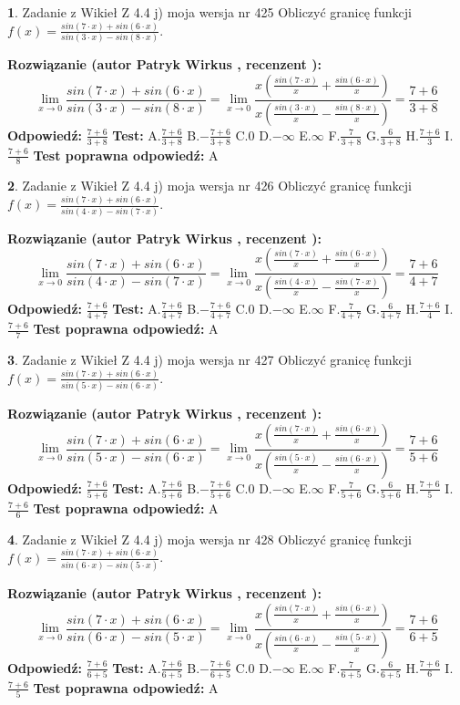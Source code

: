 \documentclass[12pt, a4paper]{article}
\theoremstyle{definition} %
\newtheorem{zad}{}
\newcommand{\zadStart}[1]{\begin{zad}#1\newline}
\newcommand{\zadStop}{\end{zad}}
\newcommand{\rozwStart}[2]{\noindent \textbf{Rozwiązanie (autor #1 , recenzent #2): }\newline}
\newcommand{\rozwStop}{\newline}
\newcommand{\odpStart}{\noindent \textbf{Odpowiedź:}\newline}
\newcommand{\odpStop}{\newline}
\newcommand{\testStart}{\noindent \textbf{Test:}\newline}
\newcommand{\testStop}{\newline}
\newcommand{\kluczStart}{\noindent \textbf{Test poprawna odpowiedź:}\newline}
\newcommand{\kluczStop}{\newline}
\begin{document}
\zadStart{Zadanie z Wikieł Z 4.4 j) moja wersja nr 425}
Obliczyć granicę funkcji $f(x)=\frac{sin(7\cdot x) +sin(6\cdot x)}{sin(3\cdot x) -sin(8\cdot x)}$.
\zadStop
\rozwStart{Patryk Wirkus}{}
$$\lim\limits_{x\to 0}\frac{sin(7\cdot x) +sin(6\cdot x)}{sin(3\cdot x) -sin(8\cdot x)}=\lim\limits_{x\to 0}\frac{x(\frac{sin(7\cdot x)}{x}+\frac{sin(6\cdot x)}{x})}{x(\frac{sin(3\cdot x)}{x}-\frac{sin(8\cdot x)}{x})}=\frac{7+6}{3+8}$$
\rozwStop
\odpStart
$\frac{7+6}{3+8}$
\odpStop
\testStart
A.$\frac{7+6}{3+8}$
B.$-\frac{7+6}{3+8}$
C.$0$
D.$-\infty$
E.$\infty$
F.$\frac{7}{3+8}$
G.$\frac{6}{3+8}$
H.$\frac{7+6}{3}$
I.$\frac{7+6}{8}$
\testStop
\kluczStart
A
\kluczStop



\zadStart{Zadanie z Wikieł Z 4.4 j) moja wersja nr 426}
Obliczyć granicę funkcji $f(x)=\frac{sin(7\cdot x) +sin(6\cdot x)}{sin(4\cdot x) -sin(7\cdot x)}$.
\zadStop
\rozwStart{Patryk Wirkus}{}
$$\lim\limits_{x\to 0}\frac{sin(7\cdot x) +sin(6\cdot x)}{sin(4\cdot x) -sin(7\cdot x)}=\lim\limits_{x\to 0}\frac{x(\frac{sin(7\cdot x)}{x}+\frac{sin(6\cdot x)}{x})}{x(\frac{sin(4\cdot x)}{x}-\frac{sin(7\cdot x)}{x})}=\frac{7+6}{4+7}$$
\rozwStop
\odpStart
$\frac{7+6}{4+7}$
\odpStop
\testStart
A.$\frac{7+6}{4+7}$
B.$-\frac{7+6}{4+7}$
C.$0$
D.$-\infty$
E.$\infty$
F.$\frac{7}{4+7}$
G.$\frac{6}{4+7}$
H.$\frac{7+6}{4}$
I.$\frac{7+6}{7}$
\testStop
\kluczStart
A
\kluczStop



\zadStart{Zadanie z Wikieł Z 4.4 j) moja wersja nr 427}
Obliczyć granicę funkcji $f(x)=\frac{sin(7\cdot x) +sin(6\cdot x)}{sin(5\cdot x) -sin(6\cdot x)}$.
\zadStop
\rozwStart{Patryk Wirkus}{}
$$\lim\limits_{x\to 0}\frac{sin(7\cdot x) +sin(6\cdot x)}{sin(5\cdot x) -sin(6\cdot x)}=\lim\limits_{x\to 0}\frac{x(\frac{sin(7\cdot x)}{x}+\frac{sin(6\cdot x)}{x})}{x(\frac{sin(5\cdot x)}{x}-\frac{sin(6\cdot x)}{x})}=\frac{7+6}{5+6}$$
\rozwStop
\odpStart
$\frac{7+6}{5+6}$
\odpStop
\testStart
A.$\frac{7+6}{5+6}$
B.$-\frac{7+6}{5+6}$
C.$0$
D.$-\infty$
E.$\infty$
F.$\frac{7}{5+6}$
G.$\frac{6}{5+6}$
H.$\frac{7+6}{5}$
I.$\frac{7+6}{6}$
\testStop
\kluczStart
A
\kluczStop



\zadStart{Zadanie z Wikieł Z 4.4 j) moja wersja nr 428}
Obliczyć granicę funkcji $f(x)=\frac{sin(7\cdot x) +sin(6\cdot x)}{sin(6\cdot x) -sin(5\cdot x)}$.
\zadStop
\rozwStart{Patryk Wirkus}{}
$$\lim\limits_{x\to 0}\frac{sin(7\cdot x) +sin(6\cdot x)}{sin(6\cdot x) -sin(5\cdot x)}=\lim\limits_{x\to 0}\frac{x(\frac{sin(7\cdot x)}{x}+\frac{sin(6\cdot x)}{x})}{x(\frac{sin(6\cdot x)}{x}-\frac{sin(5\cdot x)}{x})}=\frac{7+6}{6+5}$$
\rozwStop
\odpStart
$\frac{7+6}{6+5}$
\odpStop
\testStart
A.$\frac{7+6}{6+5}$
B.$-\frac{7+6}{6+5}$
C.$0$
D.$-\infty$
E.$\infty$
F.$\frac{7}{6+5}$
G.$\frac{6}{6+5}$
H.$\frac{7+6}{6}$
I.$\frac{7+6}{5}$
\testStop
\kluczStart
A
\kluczStop
\end{document}
